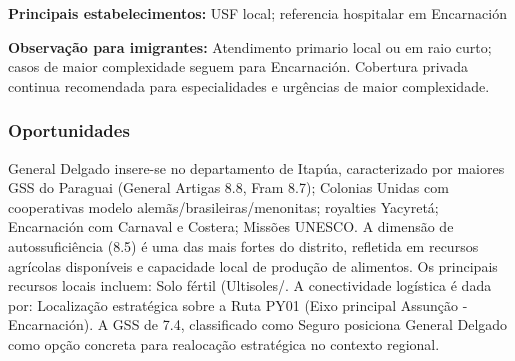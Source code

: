 \textbf{Principais estabelecimentos:} USF local; referencia hospitalar
em Encarnación

\textbf{Observação para imigrantes:} Atendimento primario local ou em
raio curto; casos de maior complexidade seguem para Encarnación.
Cobertura privada continua recomendada para especialidades e urgências
de maior complexidade.
\newpage

\subsubsection*{Oportunidades}\label{oport-general-delgado-0713}
General Delgado insere-se no departamento de Itapúa, caracterizado por maiores GSS do Paraguai (General Artigas 8.8, Fram 8.7); Colonias Unidas com cooperativas modelo alemãs/brasileiras/menonitas; royalties Yacyretá; Encarnación com Carnaval e Costera; Missões UNESCO. A dimensão de autossuficiência (8.5) é uma das mais fortes do distrito, refletida em recursos agrícolas disponíveis e capacidade local de produção de alimentos. Os principais recursos locais incluem: Solo fértil (Ultisoles/. A conectividade logística é dada por: Localização estratégica sobre a Ruta PY01 (Eixo principal Assunção - Encarnación). A GSS de 7.4, classificado como Seguro posiciona General Delgado como opção concreta para realocação estratégica no contexto regional.

